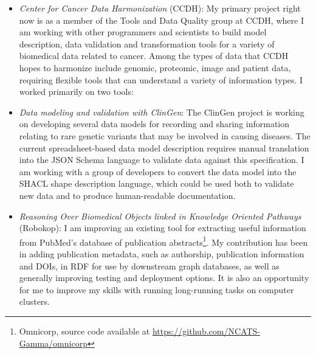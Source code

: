 \begin{itemize}

\item \textit{Center for Cancer Data Harmonization} (CCDH): My primary project right now is as a member of the Tools and Data Quality group at CCDH, where I am working with other programmers and scientists to build model description, data validation and transformation tools for a variety of biomedical data related to cancer. Among the types of data that CCDH hopes to harmonize include genomic, proteomic, image and patient data, requiring flexible tools that can understand a variety of information types. I worked primarily on two tools:

\begin{products}



\end{products}

\item \textit{Data modeling and validation with ClinGen}: The ClinGen project is working on developing several data models for recording and sharing information relating to rare genetic variants that may be involved in causing diseases. The current spreadsheet-based data model description requires manual translation into the JSON Schema language to validate data against this specification. I am working with a group of developers to convert the data model into the SHACL shape description language, which could be used both to validate new data and to produce human-readable documentation.

\begin{products}


\end{products}

\item \textit{Reasoning Over Biomedical Objects linked in Knowledge Oriented Pathways} (Robokop): I am improving an existing tool for extracting useful information from PubMed's database of publication abstracts\footnote{Omnicorp, source code available at \url{https://github.com/NCATS-Gamma/omnicorp}}. My contribution has been in adding publication metadata, such as authorship, publication information and DOIs, in RDF for use by downstream graph databases, as well as generally improving testing and deployment options. It is also an opportunity for me to improve my skills with running long-running tasks on computer clusters.



\end{itemize}
